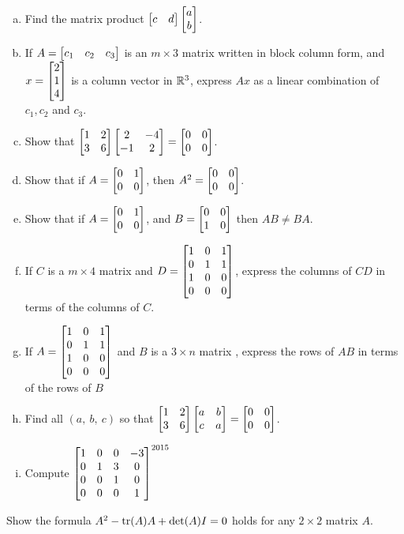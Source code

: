 \begin{prob}
\begin{enumerate}[a)]
\item Find the matrix product $\bmatrix c&d \endbmatrix \bmatrix a \\ b \endbmatrix $.
\medskip
%
\item\sov  If $A=\bmatrix c_1&c_2 &c_3\endbmatrix$ is an $m\times 3$ matrix written in block column form, and $x=\bmatrix 2\\1\\ 4\endbmatrix$ is a column vector in $\mathbb{R}^3$, express $Ax$ as a linear combination of $c_1, c_2$ and $c_3$. 
\medskip
%
\item Show that $
\bmatrix 1&2\\ 3&6\endbmatrix \bmatrix 2&-4\\ -1&2\endbmatrix=\bmatrix0&0\cr 0&0\endbmatrix$.
\medskip
%
\item\sov  Show that if $A=
\bmatrix 0&1\\ 0&0\endbmatrix$, then $A^2=\bmatrix0&0\cr 0&0\endbmatrix$. 
\medskip
%
\item Show that if $A=
\bmatrix 0&1\\ 0&0\endbmatrix$, and $B=\bmatrix 0&0\\ 1&0\endbmatrix$ then $AB \not= BA$. 
\medskip
%
\item\sov  If $C$ is a $m\times 4$ matrix and $D  =\bmatrix 1&0&1\\0&1&1\\ 1&0&0\\0&0&0 \endbmatrix $, express the columns of $CD$ in terms of the columns of $C$.
\medskip
%
\item If $A=\bmatrix 1&0&1\\0&1&1\\ 1&0&0\\0&0&0 \endbmatrix  $ and $B$ is a $3\times n$ matrix   , express the rows of $AB$ in terms of the rows of $B$
\medskip
%
\item\sov   Find  all $ (a,\ b,\ c)$ so that $\bmatrix 1&
2\\ 3&6\endbmatrix \bmatrix a&b\\ c&a\endbmatrix=\bmatrix0&0\cr 0&0\endbmatrix
 $.
\medskip
%
\item Compute $ \bmatrix  1&0&0&-3\\ 0&1&3&0\\ 0&0&1&0
\\ 0&0&0&1
\endbmatrix^{2015}$
\medskip
%
\end{enumerate}
 \end{prob}
\begin{prob}
\label{prob14.2}
Show the formula $A^2 - \operatorname{tr}(A)A + \det(A)I = 0$ holds for any $2\times 2$ matrix $A$.
\end{prob}

